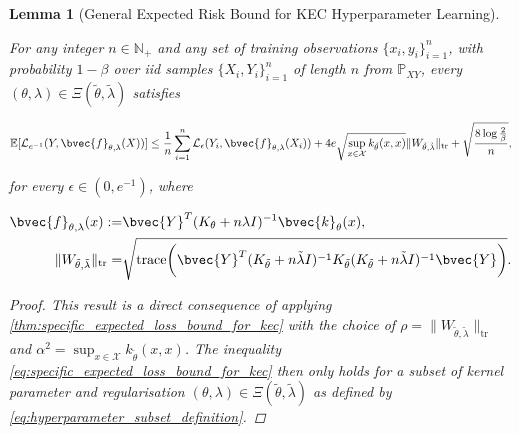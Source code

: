 \documentclass{article}
\newtheorem{lemma}[theorem]{Lemma}
\begin{document}
		\begin{lemma}[General Expected Risk Bound for KEC Hyperparameter Learning]
			\label{thm:general_expected_risk_bound_hyperparameter_learning}
			
			For any integer $n \in \mathbb{N}_{+}$ and any set of training observations $\{x_{i}, y_{i}\}_{i = 1}^{n}$, with probability $1 - \beta$ over \textit{iid} samples $\{X_{i}, Y_{i}\}_{i = 1}^{n}$ of length $n$ from $\mathbb{P}_{X Y}$, every $(\theta, \lambda) \in \Xi(\tilde{\theta}, \tilde{\lambda})$ satisfies
			
			\begin{equation}
				\mathbb{E}[\mathcal{L}_{e^{-1}}(Y, \bvec{f}_{\theta, \lambda}(X))] \leq \frac{1}{n} \sum_{i = 1}^{n} \mathcal{L}_{\epsilon}(Y_{i}, \bvec{f}_{\theta, \lambda}(X_{i})) + 4 e \sqrt{\sup_{x \in \mathcal{X}} k_{\tilde{\theta}}(x, x)} \| W_{\tilde{\theta}, \tilde{\lambda}} \|_{\mathrm{tr}} + \sqrt{\frac{8 \log{\frac{2}{\beta}}}{n}},
			\label{eq:general_expected_risk_bound_hyperparameter_learning}
			\end{equation}
			
			for every $\epsilon \in (0, e^{-1})$, where 
			
			\begin{equation}
				\begin{aligned}
					\bvec{f}_{\theta, \lambda}(x) :=& \bvec{Y}^{T} (K_{\theta} + n \lambda I)^{-1} \bvec{k}_{\theta}(x), \\
					\| W_{\tilde{\theta}, \tilde{\lambda}} \|_{\mathrm{tr}} =& \sqrt{\mathrm{trace}\bigg(\bvec{Y}^{T} (K_{\tilde{\theta}} + n \tilde{\lambda} I)^{-1} K_{\tilde{\theta}} (K_{\tilde{\theta}} + n \tilde{\lambda} I)^{-1} \bvec{Y}\bigg)}.
				\end{aligned}
			\end{equation}
			
			\begin{proof}
				This result is a direct consequence of applying \cref{thm:specific_expected_loss_bound_for_kec} with the choice of $\rho = \| W_{\tilde{\theta}, \tilde{\lambda}} \|_{\mathrm{tr}}$ and $\alpha^{2} = \sup_{x \in \mathcal{X}} k_{\tilde{\theta}}(x, x)$. The inequality \eqref{eq:specific_expected_loss_bound_for_kec} then only holds for a subset of kernel parameter and regularisation $(\theta, \lambda) \in \Xi(\tilde{\theta}, \tilde{\lambda})$ as defined by \eqref{eq:hyperparameter_subset_definition}.
			\end{proof}
		\end{lemma}
		
\end{document}
